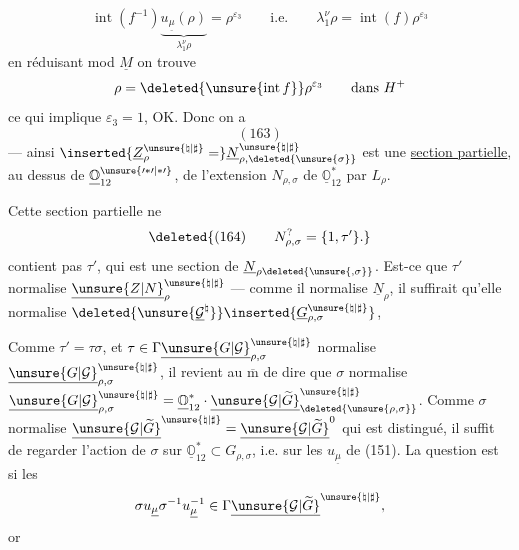 \[
\operatorname{int}(f^{-1})\underbrace{u_{\underline\mu}(\rho)}_{\lambda_1^\nu\rho}
=\rho^{\varepsilon_3}\qquad\text{i.e.}\qquad
\lambda_1^\nu\rho=\operatorname{int}(f)\rho^{\varepsilon_3}
\]
en réduisant mod $\underline M$ on trouve
\[
\rho=\deleted{\unsure{\operatorname{int}f}}\rho^{\varepsilon_3}\qquad\text{dans }H^+
\]
ce qui implique $\varepsilon_3=1$, OK. Donc on a
\[
(163)
\]
--- ainsi $\inserted{\underline Z_\rho^{\unsure{\natural|\sharp}}=}\underline N_{\rho,\deleted{\unsure{\sigma}}}^{\unsure{\natural|\sharp}}$ est une \uline{section partielle}, au dessus de $\underline{\mathbb O}_{12}^{\unsure{\prime*\prime|*\prime}}$, de l'extension $N_{\rho,\sigma}$ de $\underline{\mathbb O}_{12}^{*}$ par $L_\rho$.

 Cette section partielle ne
\[
\deleted{(164)\qquad N_{\rho,\sigma}^{?}=\{1,\tau'\}.}
\]
contient pas $\tau'$, qui est une section de $\underline N_{\rho\deleted{\unsure{,\sigma}}}$. Est-ce que $\tau'$ normalise $\underline{\unsure{Z|N}}_\rho^{\unsure{\natural|\sharp}}$ --- comme il normalise $\underline N_\rho$, il suffirait qu'elle normalise
$\deleted{\unsure{\underline{\mathcal G}^{\natural}}}\inserted{\underline G_{\rho,\sigma}^{\unsure{\natural|\sharp}}}$,

Comme $\tau'=\tau\sigma$,  et
$\tau\in\Gamma\underline{\unsure{G|\mathcal G}}_{\rho,\sigma}^{\unsure{\natural|\sharp}}$
normalise $\underline{\unsure{G|\mathcal G}}_{\rho,\sigma}^{\unsure{\natural|\sharp}}$,
il revient au $\overline{\mathrm m}$ de dire que $\sigma$ normalise
$\underline{\unsure{G|\mathcal G}}_{\rho,\sigma}^{\unsure{\natural|\sharp}}
=\underline{\mathbb O}_{12}^{*}\cdot\underline{\unsure{\mathcal G|\widetilde G}}^{\unsure{\natural|\sharp}}_{\deleted{\unsure{\rho,\sigma}}}$.
Comme $\sigma$ normalise $\underline{\unsure{\mathcal G|\widetilde G}}^{\unsure{\natural|\sharp}}=\underline{\unsure{\mathcal G|\widetilde G}}^0$ qui est distingué, il suffit de regarder l'action de $\sigma$ sur $\underline{\mathbb O}_{12}^{*}\subset G_{\rho,\sigma}$,  i.e. sur les $u_{\underline\mu}$ de (151). La question est si les
\[
\sigma u_{\underline\mu}\sigma^{-1}u_{\underline\mu}^{-1}\in\Gamma\underline{\unsure{\mathcal G|\widetilde G}}^{\unsure{\natural|\sharp}},
\]
or

